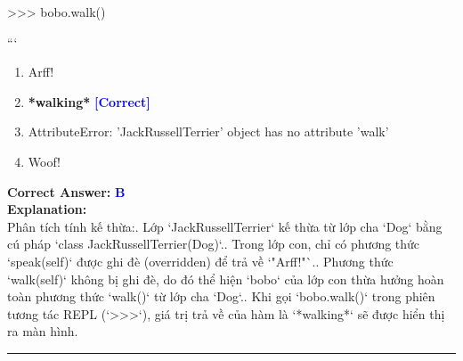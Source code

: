 \documentclass[11pt,a4paper]{article}
\begin{document}
\begin{minipage}{\textwidth}
{\newline
>>> bobo.walk()\newline

\newline
```}

\begin{enumerate}[label=\Alph*.]
    \item Arff!
    \item \textbf{*walking*} \hfill \textcolor{blue}{\textbf{[Correct]}}
    \item AttributeError: 'JackRussellTerrier' object has no attribute 'walk'
    \item Woof!
\end{enumerate}

\noindent \textbf{Correct Answer:} \textcolor{blue}{\textbf{B}} \\[4pt]
\noindent \textbf{Explanation:}\\
Phân tích tính kế thừa:. Lớp `JackRussellTerrier` kế thừa từ lớp cha `Dog` bằng cú pháp `class JackRussellTerrier(Dog)`.. Trong lớp con, chỉ có phương thức `speak(self)` được ghi đè (overridden) để trả về `"Arff!"`.. Phương thức `walk(self)` không bị ghi đè, do đó thể hiện `bobo` của lớp con thừa hưởng hoàn toàn phương thức `walk()` từ lớp cha `Dog`.. Khi gọi `bobo.walk()` trong phiên tương tác REPL (`>>>`), giá trị trả về của hàm là `*walking*` sẽ được hiển thị ra màn hình.
\end{minipage}
\vspace{0.8cm}
\hrule
\vspace{0.5cm}
\end{document}
